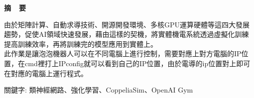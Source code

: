 \renewcommand{\baselinestretch}{1.5} %
\clearpage  %
\sectionef
{} %
\begin{center}
\LARGE\textbf{摘~~要}\\
\end{center}
\begin{flushleft}
\fontsize{14pt}{20pt}\sectionef\hspace{12pt}\quad 由於矩陣計算、自動求導技術、開源開發環境、多核GPU運算硬體等這四大發展趨勢，促使AI領域快速發展，藉由這樣的契機，將實體機電系統透過虛擬化訓練提高訓練效率，再將訓練完的模型應用到實體上。\\[12pt]

\fontsize{14pt}{20pt}\sectionef\hspace{12pt}\quad 此作業是讓泡泡機器人可以在不同電腦上進行控制，需要對應上對方電腦的IP位置，在cmd裡打上IPconfig就可以看到自己的IP位置，由於電導的ip位置對上即可在對應的電腦上運行程式。\\[12pt]

\end{flushleft}
\begin{center}
\fontsize{14pt}{20pt}\selectfont 關鍵字: 類神經網路、強化學習、\sectionef CoppeliaSim、OpenAI Gym
\end{center}
\newpage
